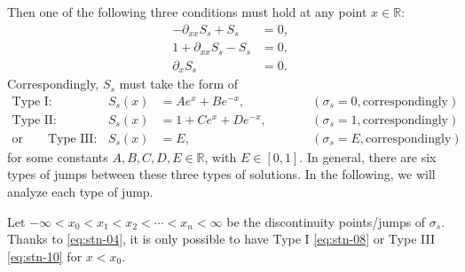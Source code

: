 \documentclass[12pt]{article}
\theoremstyle{definition}
\theoremstyle{remark}
\newcommand{\dx}{\partial_x}
\numberwithin{equation}{section}
\begin{document}
Then one of the following three conditions must hold at any point $ x \in \mathbb R $:
\begin{align}
    - \partial_{xx} S_s + S_s & = 0, \label{eq:stn-05} \\
    1 + \partial_{xx} S_s - S_s & =0, \label{eq:stn-06} \\
    \partial_x S_s & =0. \label{eq:stn-07}
\end{align}
Correspondingly, $ S_s $ must take the form of 
\begin{align}
    \text{Type I:} \quad && S_s(x) & = A e^x + B e^{-x}, && \qquad (\sigma_s = 0, \text{correspondingly})\label{eq:stn-08} \\
    \text{Type II:} \quad && S_s(x) &= 1 + C e^x + D e^{-x}, && \qquad (\sigma_s = 1, \text{correspondingly})\label{eq:stn-09} \\
    \text{or} \qquad \text{Type III:} \quad && S_s(x) &= E, && \qquad (\sigma_s = E, \text{correspondingly}) \label{eq:stn-10}
\end{align}
for some constants $ A,B,C,D,E \in \mathbb R $, with $ E \in [0,1] $. In general, there are six types of jumps between these three types of solutions. In the following, we will analyze each type of jump. 




Let $ -\infty < x_0 < x_1 < x_2 < \cdots < x_n < \infty $ be the discontinuity points/jumps of $ \sigma_s $.
Thanks to \eqref{eq:stn-04}, it is only possible to have Type I \eqref{eq:stn-08} or Type III \eqref{eq:stn-10} for $ x < x_0 $. 
\end{document}
